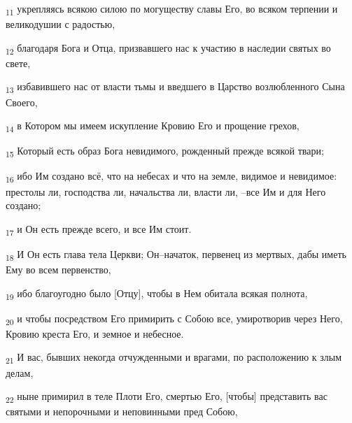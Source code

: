 \begin{tcolorbox}
\textsubscript{11} укрепляясь всякою силою по могуществу славы Его, во всяком терпении и великодушии с радостью,
\end{tcolorbox}
\begin{tcolorbox}
\textsubscript{12} благодаря Бога и Отца, призвавшего нас к участию в наследии святых во свете,
\end{tcolorbox}
\begin{tcolorbox}
\textsubscript{13} избавившего нас от власти тьмы и введшего в Царство возлюбленного Сына Своего,
\end{tcolorbox}
\begin{tcolorbox}
\textsubscript{14} в Котором мы имеем искупление Кровию Его и прощение грехов,
\end{tcolorbox}
\begin{tcolorbox}
\textsubscript{15} Который есть образ Бога невидимого, рожденный прежде всякой твари;
\end{tcolorbox}
\begin{tcolorbox}
\textsubscript{16} ибо Им создано всё, что на небесах и что на земле, видимое и невидимое: престолы ли, господства ли, начальства ли, власти ли, --все Им и для Него создано;
\end{tcolorbox}
\begin{tcolorbox}
\textsubscript{17} и Он есть прежде всего, и все Им стоит.
\end{tcolorbox}
\begin{tcolorbox}
\textsubscript{18} И Он есть глава тела Церкви; Он--начаток, первенец из мертвых, дабы иметь Ему во всем первенство,
\end{tcolorbox}
\begin{tcolorbox}
\textsubscript{19} ибо благоугодно было [Отцу], чтобы в Нем обитала всякая полнота,
\end{tcolorbox}
\begin{tcolorbox}
\textsubscript{20} и чтобы посредством Его примирить с Собою все, умиротворив через Него, Кровию креста Его, и земное и небесное.
\end{tcolorbox}
\begin{tcolorbox}
\textsubscript{21} И вас, бывших некогда отчужденными и врагами, по расположению к злым делам,
\end{tcolorbox}
\begin{tcolorbox}
\textsubscript{22} ныне примирил в теле Плоти Его, смертью Его, [чтобы] представить вас святыми и непорочными и неповинными пред Собою,
\end{tcolorbox}
